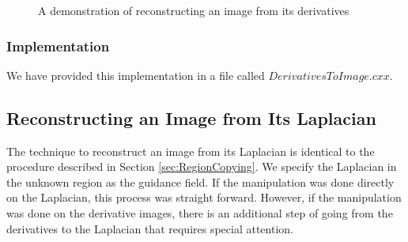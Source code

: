 \documentclass{InsightArticle}
\begin{document}
\begin{figure}[H]
\centering
{}
\caption{A demonstration of reconstructing an image from its derivatives}
\label{fig:DerivativeReconstruction}
\end{figure}

\subsubsection{Implementation}
We have provided this implementation in a file called $DerivativesToImage.cxx$.

\subsection{Reconstructing an Image from Its Laplacian}
\label{sec:ReconstructingFromLaplacian}
The technique to reconstruct an image from its Laplacian is identical to the procedure described in Section \ref{sec:RegionCopying}. We specify the Laplacian in the unknown region as the guidance field. If the manipulation was done directly on the Laplacian, this process was straight forward. However, if the manipulation was done on the derivative images, there is an additional step of going from the derivatives to the Laplacian that requires special attention.
\end{document}

